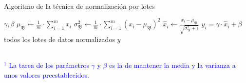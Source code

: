 \begin{algorithm}
\caption{Algoritmo de la técnica de normalización por lotes \cite{BatchNormalization}}
\label{alg:BatchNormalization}
\begin{algorithmic}[1]
        \State \VARIABLES $\gamma, \beta$ \textcolor{blue}{\footnotemark[1]} 
        \Repeat
                \State $\mu_\mathfrak{B} \gets \frac{1}{m}\cdot \sum\limits_{i=1}^{m} x_i$ 
                \State $\sigma_\mathfrak{B}^{2} \gets \frac{1}{m}\cdot \sum\limits_{i=1}^{m} (x_i - \mu_\mathfrak{B})^2 $ 
                \State $\hat{x}_i \gets \frac{x_i - \mu_\mathfrak{B}}{\sqrt{\sigma_\mathfrak{B}^{2} + \epsilon}}$
                \State $y_i = \gamma \cdot \hat{x}_i + \beta$
            \EndFor
        \Until todos los lotes de datos normalizados
        \State \Return $y$
    \EndFunction
\end{algorithmic}
\textcolor{blue}{\footnotesize{\\ $^1$ La tarea de los parámetros $ \gamma $ y $\beta$ es la de mantener la media y la varianza a unos valores preestablecidos.}}
\end{algorithm}